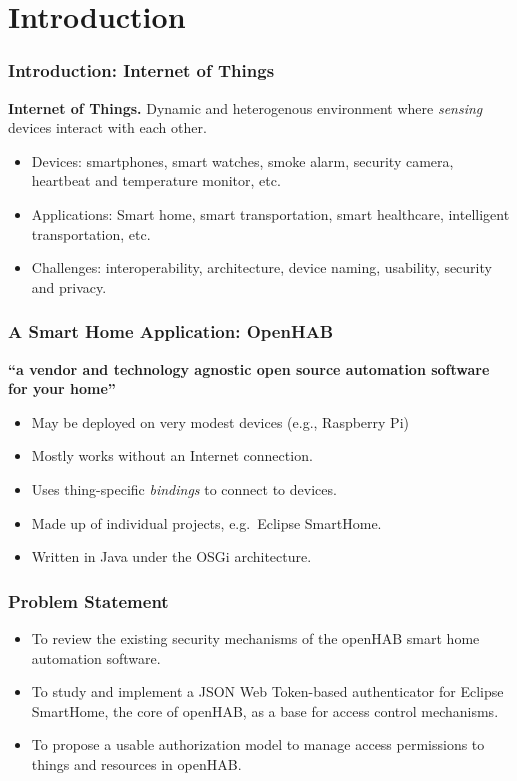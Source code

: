 \documentclass{beamer}
\begin{document}
\section{Introduction} %
\begin{frame}
\frametitle{Introduction: Internet of Things}
\textbf{Internet of Things.} Dynamic and heterogenous environment where \emph{sensing} devices interact with each other. 
\begin{itemize}
\setlength\itemsep{1.5em}
\item Devices: smartphones, smart watches, smoke alarm, security camera, heartbeat and temperature monitor, etc.
\item Applications: Smart home, smart transportation, smart healthcare, intelligent transportation, etc.
\item Challenges: interoperability, architecture, device naming, usability, security and privacy.  
\end{itemize}
\end{frame}
\begin{frame}
\frametitle{A Smart Home Application: OpenHAB}
\textbf{``a vendor and technology agnostic open source automation software for your home''}~\cite{oh_01}
\begin{itemize}
  \setlength\itemsep{1.5em}
\item May be deployed on very modest devices (e.g., Raspberry Pi)
\item Mostly works without an Internet connection.
\item Uses thing-specific \emph{bindings} to connect to devices.
\item Made up of individual projects, e.g.\ Eclipse SmartHome.
\item Written in Java under the OSGi architecture. 
\end{itemize}
\end{frame}
\begin{frame}
\frametitle{Problem Statement}
\begin{itemize}
  \setlength\itemsep{1.5em}
\item To review the existing security mechanisms of the openHAB smart home automation software.
\item To study and implement a JSON Web Token-based authenticator for Eclipse SmartHome, the core of openHAB, as a base for access control mechanisms.
\item To propose a usable authorization model to manage access permissions to things and resources in openHAB. 
\end{itemize}
\end{frame}
\end{document}
